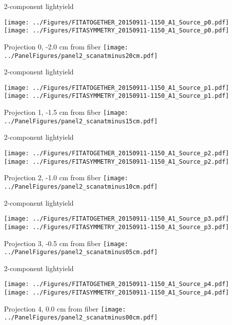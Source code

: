 \documentclass[compress,8pt]{beamer} %
\begin{document}

\begin{frame}{2-component lightyield}
\begin{adjustwidth}{-2em}{-2em}
\texttt{[image: ../Figures/FITATOGETHER\_20150911-1150\_A1\_Source\_p0.pdf]}
\texttt{[image: ../Figures/FITASYMMETRY\_20150911-1150\_A1\_Source\_p0.pdf]}
\end{adjustwidth}
Projection 0, -2.0 cm from fiber
\hfill \texttt{[image: ../PanelFigures/panel2\_scanatminus20cm.pdf]}
\end{frame}

\begin{frame}{2-component lightyield}
\begin{adjustwidth}{-2em}{-2em}
\texttt{[image: ../Figures/FITATOGETHER\_20150911-1150\_A1\_Source\_p1.pdf]}
\texttt{[image: ../Figures/FITASYMMETRY\_20150911-1150\_A1\_Source\_p1.pdf]}
\end{adjustwidth}
Projection 1, -1.5 cm from fiber
\hfill \texttt{[image: ../PanelFigures/panel2\_scanatminus15cm.pdf]}
\end{frame}

\begin{frame}{2-component lightyield}
\begin{adjustwidth}{-2em}{-2em}
\texttt{[image: ../Figures/FITATOGETHER\_20150911-1150\_A1\_Source\_p2.pdf]}
\texttt{[image: ../Figures/FITASYMMETRY\_20150911-1150\_A1\_Source\_p2.pdf]}
\end{adjustwidth}
Projection 2, -1.0 cm from fiber
\hfill \texttt{[image: ../PanelFigures/panel2\_scanatminus10cm.pdf]}
\end{frame}

\begin{frame}{2-component lightyield}
\begin{adjustwidth}{-2em}{-2em}
\texttt{[image: ../Figures/FITATOGETHER\_20150911-1150\_A1\_Source\_p3.pdf]}
\texttt{[image: ../Figures/FITASYMMETRY\_20150911-1150\_A1\_Source\_p3.pdf]}
\end{adjustwidth}
Projection 3, -0.5 cm from fiber
\hfill \texttt{[image: ../PanelFigures/panel2\_scanatminus05cm.pdf]}
\end{frame}

\begin{frame}{2-component lightyield}
\begin{adjustwidth}{-2em}{-2em}
\texttt{[image: ../Figures/FITATOGETHER\_20150911-1150\_A1\_Source\_p4.pdf]}
\texttt{[image: ../Figures/FITASYMMETRY\_20150911-1150\_A1\_Source\_p4.pdf]}
\end{adjustwidth}
Projection 4, 0.0 cm from fiber
\hfill \texttt{[image: ../PanelFigures/panel2\_scanatminus00cm.pdf]}
\end{frame}
\end{document}
